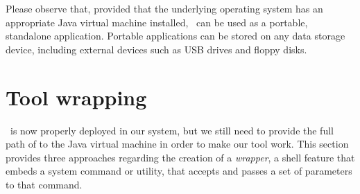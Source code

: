 Please observe that, provided that the underlying operating system has an appropriate Java virtual machine installed, \arara\ can be used as a portable, standalone application. Portable applications can be stored on any data storage device, including external devices such as USB drives and floppy disks.

\section{Tool wrapping}
\label{sec:toolwrapping}

\arara\ is now properly deployed in our system, but we still need to provide the full path of  to the Java virtual machine in order to make our tool work. This section provides three approaches regarding the creation of a \emph{wrapper}, a shell feature that embeds a system command or utility, that accepts and passes a set of parameters to that command.

